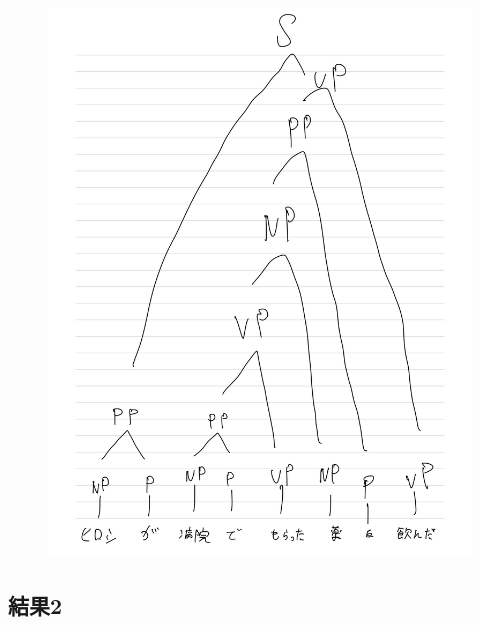 \documentclass[dvipdfmx,autodetect-engine,titlepage]{jsarticle}
\begin{document}
\begin{figure}[h]
\begin{minipage}[b]{0.45\linewidth}
\begin{center}
    \includegraphics[keepaspectratio,scale=0.08]{pic2.jpg}
    \end{center}
    \caption{}
  \end{minipage}
\end{figure}

\subsection{結果2}
\end{document}
